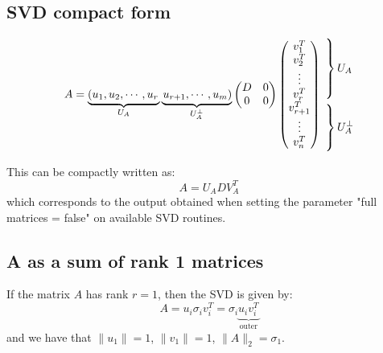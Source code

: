 \subsection{SVD compact form}
$$
A = \underbrace{\left(u_1, u_2, \cdots, u_r\right.}_{U_A} \underbrace{\left.u_{r+1}, \cdots, u_m\right)}_{U_A^\perp}
\begin{pmatrix}
D & 0 \\
0 & 0
\end{pmatrix}
    \begin{pmatrix}
        v_1^T \\
        v_2^T \\
        \vdots \\
        v_r^T \\
        v_{r+1}^T \\
        \vdots \\
        v_n^T
        \end{pmatrix}
    \begin{aligned}
        &\left.
            \vphantom{\begin{matrix}
                u_1 \\
                u_2 \\
                \vdots \\
                u_r 
                \end{matrix}}
        \right\}U_A \\
        &\left.
            \vphantom{\begin{matrix}
                u_1 \\
                \vdots \\
                u_r 
                \end{matrix}}
        \right\}U_A^\perp
    \end{aligned}
$$
    
This can be compactly written as:
\[
A = U_A D V_A^T
\]
which corresponds to the output obtained when setting the parameter "full matrices = false" on available SVD routines.

\subsection{A as a sum of rank 1 matrices}
If the matrix \( A \) has rank \( r = 1 \), then the SVD is given by:
\[
A = u_i \sigma_i v_i^T = \sigma_i \underbrace{u_i v_i^T}_{\text{outer}}
\]
and we have that $\| u_1 \| = 1$, $ \| v_1 \| = 1$, $\| A \|_2 = \sigma_1$.

